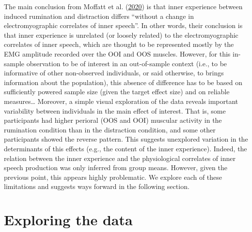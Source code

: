 \documentclass[
  english,
  man,floatsintext]{apa6}
\begin{document}
The main conclusion from Moffatt et al. (\protect\hyperlink{ref-moffatt_inner_2020}{2020}) is that inner experience between induced rumination and distraction differs ``without a change in electromyographic correlates of inner speech''. In other words, their conclusion is that inner experience is unrelated (or loosely related) to the electromyographic correlates of inner speech, which are thought to be represented mostly by the EMG amplitude recorded over the OOI and OOS muscles. However, for this in-sample observation to be of interest in an out-of-sample context (i.e., to be informative of other non-observed individuals, or said otherwise, to brings information about the population), this absence of difference has to be based on sufficiently powered sample size (given the target effect size) and on reliable measures\ldots{} Moreover, a simple visual exploration of the data reveals important variability between individuals in the main effect of interest. That is, some participants had higher perioral (OOS and OOI) muscular activity in the rumination condition than in the distraction condition, and some other participants showed the reverse pattern. This suggests unexplored variation in the determinants of this effects (e.g., the content of the inner experience). Indeed, the relation between the inner experience and the physiological correlates of inner speech production was only inferred from group means. However, given the previous point, this appears highly problematic. We explore each of these limitations and suggests ways forward in the following section.

\hypertarget{exploring-the-data}{%
\section{Exploring the data}\label{exploring-the-data}}
\end{document}
